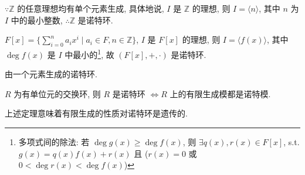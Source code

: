 \documentclass{note}
\begin{document}
\begin{eg}
    $\because\mathbb{Z}$ 的任意理想均有单个元素生成, 具体地说, $I$ 是 $\mathbb{Z}$ 的理想, 则 $I=\langle n\rangle$, 其中 $n$ 为 $I$ 中的最小整数, $\therefore\mathbb{Z}$ 是诺特环.
\end{eg}

\begin{eg}
    $F[x]=\{\sum_{i=0}^na_ix^i\mid a_i\in F,n\in\mathbb{Z}\}$, $I$ 是 $F[x]$ 的理想, 则 $I=\langle f(x)\rangle$, 其中 $\deg f(x)$ 是 $I$ 中最小的\footnote{多项式间的除法: 若 $\deg g(x)\geq\deg f(x)$, 则 $\exists q(x),r(x)\in F[x]$, s.t. $g(x)=q(x)f(x)+r(x)$ 且 ($r(x)=0$ 或 $0<\deg r(x)<\deg f(x)$)}, 故 $(F[x],+,\cdot)$ 是诺特环.
\end{eg}

\begin{df}[主理想]
    由一个元素生成的诺特环.
\end{df}

\begin{thm}[(课本定理 5.7)]\label{thm-5.7}
    $R$ 为有单位元的交换环, 则 $R$ 是诺特环 $\Longleftrightarrow R$ 上的有限生成模都是诺特模.
\end{thm}

上述定理意味着有限生成的性质对诺特环是遗传的.
\end{document}
